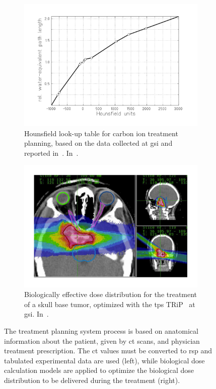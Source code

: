  \begin{figure}[!htbp]
 \begin{subfigure}[t]{.49\textwidth}
\centering
\includegraphics[width=0.92\linewidth]{03_GraphicFiles/chapter1_Introduction/HounsfieldUnits.pdf}	
\caption{Hounsfield look-up table for carbon ion treatment planning, based on the data collected at \gls{gsi} and reported in~\cite{Jakel2001}. In~\cite{Rietzel2007}.}
\label{chap1::fig::HU}
\end{subfigure}
 \begin{subfigure}[t]{.49\textwidth}
\centering
\includegraphics[width=0.92\linewidth]{03_GraphicFiles/chapter1_Introduction/TRIPplan.pdf}
\caption{Biologically effective dose distribution for the treatment of a skull base tumor, optimized with the \gls{tps} TRiP~\parencite{Kramer2000} at \gls{gsi}. In~\cite{Schardt2010}.}
\label{chap1::fig::tps_plan}
\end{subfigure}
\caption{The treatment planning system process is based on anatomical information about the patient, given by \gls{ct} scans, and physician treatment prescription. The \gls{ct} values must be converted to \gls{rsp} and tabulated experimental data are used (left), while biological dose calculation models are applied to optimize the biological dose distribution to be delivered during the treatment (right).}
\label{chap1::fig::TPS}
\end{figure}           

